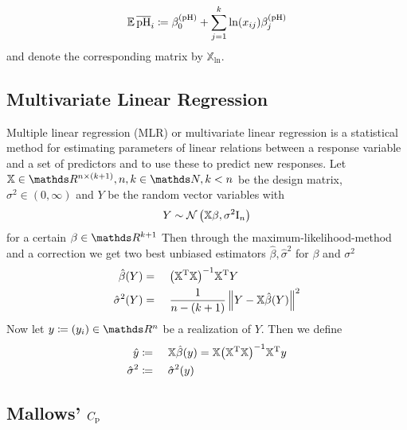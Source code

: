 		\[
			\operatorname{\mathbb{E}} \mathrm{\overline{pH}}_i \coloneqq \beta^{\mathrm{\mathrm{(pH)}}}_0 + \sum_{j = 1}^k{\ln (x_{ij}) \beta^{\mathrm{(pH)}}_j} 
		\]
		and denote the corresponding matrix by $\mathbb{X}_{\ln}$.

	

	\subsection{Multivariate Linear Regression}
	\label{ssec:mlr}
	
		Multiple linear regression (MLR) or multivariate linear regression is a statistical method for estimating parameters of linear relations between a response variable and a set of predictors and to use these to predict new responses.
		Let $\mathbb{X}\in\SR^{n\times(k+1)}, n,k\in\SN,k<n$ be the design matrix, $\sigma^2\in(0,\infty)$ and $Y$ be the random vector variables with
		\[
			Y \sim \mathcal{N}\left( \mathbb{X}\beta,\sigma^2\mathrm{I}_n \right)
		\]
		for a certain $\beta\in\SR^{k+1}$
		Then through the maximum-likelihood-method and a correction we get two best unbiased estimators $\hat{\beta},\hat{\sigma}^2$ for $\beta$ and $\sigma^2$
		\begin{alignat*}{3}
			\hat{\beta}(Y) &=&&\ \inv{\curvb{\transp{\mathbb{X}}\mathbb{X}}}\transp{\mathbb{X}}Y \\
			\hat{\sigma}^2(Y) &=&&\ \frac{1}{n-(k+1)}\norm{Y - \mathbb{X}\hat{\beta}(Y)}^2
		\end{alignat*}
		Now let $y \define (y_i)\in\SR^n$ be a realization of $Y$.
		Then we define
		\begin{alignat*}{3}
			\hat{y} &\coloneqq&&\ \mathbb{X}\hat{\beta}(y) = \mathbb{X}{\left( {\mathbb{X}}^{\mathrm{T}}\mathbb{X} \right)}^{-1}{\mathbb{X}}^{\mathrm{T}}y \\
			\hat{\sigma}^2 &\coloneqq&&\ \hat{\sigma}^2(y)
		\end{alignat*}
	

	\subsection{Mallows' $C_{\mathrm{p}}$}
	\label{ssec:mallows-C_p}
	
